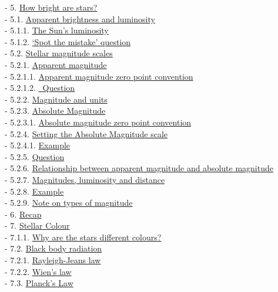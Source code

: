 \documentclass[
  letterpaper,
  DIV=11,
  numbers=noendperiod]{scrreprt}
\begin{document}
- 5. \protect\hyperlink{toc5_}{How bright are stars?}\\
- 5.1. \protect\hyperlink{toc5_1_}{Apparent brightness and luminosity}\\
- 5.1.1. \protect\hyperlink{toc5_1_1_}{The Sun's luminosity}\\
- 5.1.2. \protect\hyperlink{toc5_1_2_}{`Spot the mistake' question}\\
- 5.2. \protect\hyperlink{toc5_2_}{Stellar magnitude scales}\\
- 5.2.1. \protect\hyperlink{toc5_2_1_}{Apparent magnitude}\\
- 5.2.1.1. \protect\hyperlink{toc5_2_1_1_}{Apparent magnitude zero point
convention}\\
- 5.2.1.2. \protect\hyperlink{toc5_2_1_2_}{~Question}\\
- 5.2.2. \protect\hyperlink{toc5_2_2_}{Magnitude and units}\\
- 5.2.3. \protect\hyperlink{toc5_2_3_}{Absolute Magnitude}\\
- 5.2.3.1. \protect\hyperlink{toc5_2_3_1_}{Absolute magnitude zero point
convention}\\
- 5.2.4. \protect\hyperlink{toc5_2_4_}{Setting the Absolute Magnitude
scale}\\
- 5.2.4.1. \protect\hyperlink{toc5_2_4_1_}{Example}\\
- 5.2.5. \protect\hyperlink{toc5_2_5_}{Question}\\
- 5.2.6. \protect\hyperlink{toc5_2_6_}{Relationship between apparent
magnitude and absolute magnitude}\\
- 5.2.7. \protect\hyperlink{toc5_2_7_}{Magnitudes, luminosity and
distance}\\
- 5.2.8. \protect\hyperlink{toc5_2_8_}{Example}\\
- 5.2.9. \protect\hyperlink{toc5_2_9_}{Note on types of magnitude}\\
- 6. \protect\hyperlink{toc6_}{Recap}\\
- 7. \protect\hyperlink{toc7_}{Stellar Colour}\\
- 7.1.1. \protect\hyperlink{toc7_1_1_}{Why are the stars different
colours?}\\
- 7.2. \protect\hyperlink{toc7_2_}{Black body radiation}\\
- 7.2.1. \protect\hyperlink{toc7_2_1_}{Rayleigh-Jeans law}\\
- 7.2.2. \protect\hyperlink{toc7_2_2_}{Wien's law}\\
- 7.3. \protect\hyperlink{toc7_3_}{Planck's Law}\\
\end{document}
